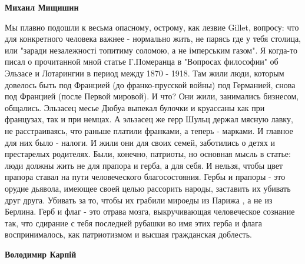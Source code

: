 \begin{itemize}
\begin{itemize}
 
\textbf{Михаил Мищишин} 

Мы плавно подошли к весьма опасному, острому, как лезвие Gillet, вопросу: что
для конкретного человека важнее - нормально жить, не парясь где у тебя столица,
или "заради незалежності топитиму соломою, а не імперським газом". Я когда-то
писал о прочитанной мной статье Г.Померанца в "Вопросах философии" об Эльзасе и
Лотарингии в период между 1870 - 1918. Там жили люди, которым довелось быть под
Францией (до франко-прусской войны) под Германией, снова под Францией (после
Первой мировой). И что? Они жили, занимались бизнесом, общались. Эльзасец месье
Дюбуа выпекал булочки и круассаны как при французах, так и при немцах. А
эльзасец же герр Шульц держал мясную лавку, не расстраиваясь, что раньше
платили франками, а теперь - марками. И главное для них было  - налоги. И жили
они для своих семей, заботились о детях и престарелых родителях. Были, конечно,
патриоты, но основная мысль в статье: люди должны жить не для прапора и герба,
а для себя. И нельзя, чтобы цвет прапора ставал на пути человеческого
благосостояния. Гербы и прапоры - это орудие дьявола, имеющее своей целью
рассорить народы, заставить их убивать друг друга. Убивать за то, чтобы их
грабили мироеды из Парижа , а не из Берлина. Герб и флаг - это отрава мозга,
выкручивающая человеческое сознание так, что сдирание с тебя последней рубашки
во имя этих герба и флага воспринималось, как патриотизмом и высшая гражданская
доблесть.


 
\textbf{Володимир Карпій} 


\end{itemize}
\end{itemize}
